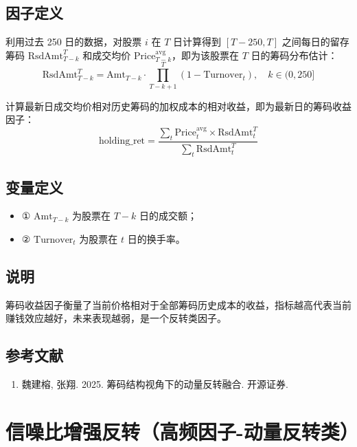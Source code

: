 \documentclass{article}
\begin{document}
\subsection{因子定义}
利用过去 250 日的数据，对股票 \( i \) 在 \( T \) 日计算得到 \([T-250, T]\) 之间每日的留存筹码 \( \mathrm{RsdAmt}_{T-k}^T \) 和成交均价 \( \mathrm{Price}_{T-k}^{\mathrm{avg}} \)，即为该股票在 \( T \) 日的筹码分布估计：
\begin{equation}
    \mathrm{RsdAmt}_{T-k}^T = \mathrm{Amt}_{T-k} \cdot \prod_{T-k+1}^{T} (1 - \mathrm{Turnover}_t), \quad k \in (0, 250]
\end{equation}

计算最新日成交均价相对历史筹码的加权成本的相对收益，即为最新日的筹码收益因子：
\begin{equation}
    \mathrm{holding\_ret} = \frac{\sum_t \mathrm{Price}_t^{\mathrm{avg}} \times \mathrm{RsdAmt}_t^T}{\sum_t \mathrm{RsdAmt}_t^T}
\end{equation}

\subsection{变量定义}
\begin{itemize}
    \item ① \( \mathrm{Amt}_{T-k} \) 为股票在 \( T-k \) 日的成交额；
    \item ② \( \mathrm{Turnover}_t \) 为股票在 \( t \) 日的换手率。
\end{itemize}

\subsection{说明}
筹码收益因子衡量了当前价格相对于全部筹码历史成本的收益，指标越高代表当前赚钱效应越好，未来表现越弱，是一个反转类因子。

\subsection{参考文献}
\begin{enumerate}
    \item 魏建榕, 张翔. 2025. 筹码结构视角下的动量反转融合. 开源证券.
\end{enumerate}

\section{信噪比增强反转（高频因子-动量反转类）}
\end{document}
